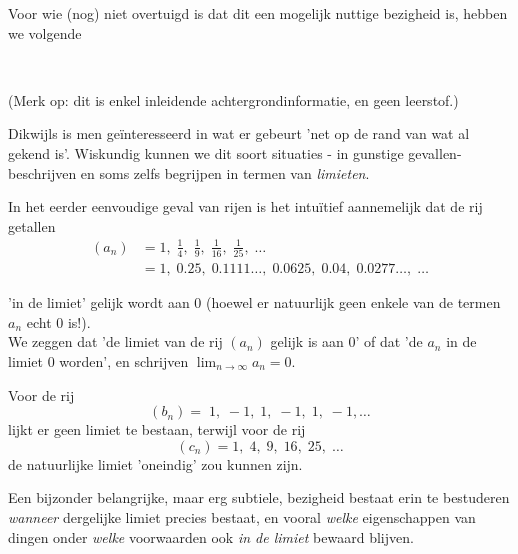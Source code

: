 \documentclass[numbers,wordchoicegiven]{ximera}
\begin{document}
\begin{expandable}
Voor wie (nog) niet overtuigd is dat dit een mogelijk nuttige bezigheid is, hebben we volgende%


\begin{uitwijding} \ 
	
(Merk op: dit is enkel inleidende achtergrondinformatie, en geen leerstof.)	

Dikwijls is men geïnteresseerd in wat er gebeurt 'net op de rand van wat al gekend is'. Wiskundig kunnen we dit soort situaties - in gunstige gevallen-  beschrijven en soms zelfs begrijpen in termen van \textit{limieten}. 

In het eerder eenvoudige geval van rijen is het intuïtief aannemelijk dat de rij getallen
\begin{align*}
(a_n) & = 1, \;\frac{1}{4}, \;\frac{1}{9}, \;\frac{1}{16},\;\frac{1}{25},\;\dots\\
                                & =1,\; 0.25,\;  0.1111\dots,\; 0.0625,\; 0.04,\; 0.0277\dots,\; \dots
\end{align*}

'in de limiet' gelijk wordt aan $0$ (hoewel er natuurlijk geen enkele van de termen $a_n$ echt $0$ is!). \\
We zeggen dat 'de limiet van de rij $(a_n)$ gelijk is aan $0$' of dat 'de $a_n$ in de limiet $0$ worden', en schrijven $\lim_{n\to\infty}a_n = 0$.

Voor de rij 
\[
(b_n) = \;1,\;-1,\;1,\;-1,\;1,\;-1,\dots
\]
lijkt er geen limiet te bestaan, 
terwijl voor de rij 
\[
(c_n) = 1,\;4,\;9,\;16,\;25,\;\dots
\]
de natuurlijke limiet 'oneindig' zou kunnen zijn.

Een bijzonder belangrijke, maar erg subtiele, bezigheid bestaat erin te bestuderen \textit{wanneer} dergelijke limiet precies bestaat, en vooral \textit{welke} eigenschappen van dingen onder \textit{welke} voorwaarden ook \textit{in de limiet} bewaard blijven. 


\end{uitwijding}
\end{expandable}
\end{document}
